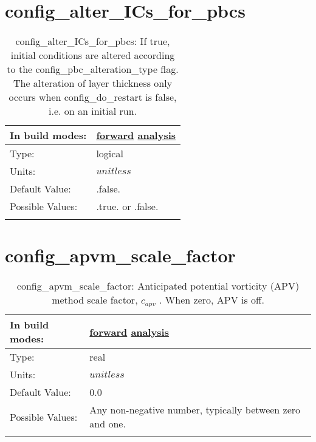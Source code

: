 \section[config\_alter\_ICs\_for\_pbcs]{config\_alter\_ICs\_for\_pbcs}
\label{sec:nm_sec_config_alter_ICs_for_pbcs}
\begin{center}
\begin{longtable}{| p{2.0in} || p{4.0in} |}
    \hline
    In build modes: & \hyperref[subsec:forward_nm_tab_partial_bottom_cells]{forward} \hyperref[subsec:analysis_nm_tab_partial_bottom_cells]{analysis} \\
    \hline
    Type: & logical \\
    \hline
    Units: & $unitless$ \\
    \hline
    Default Value: & .false. \\
    \hline
    Possible Values: & .true. or .false. \\
    \hline
    \caption{config\_alter\_ICs\_for\_pbcs: If true, initial conditions are altered according to the config\_pbc\_alteration\_type flag. The alteration of layer thickness only occurs when config\_do\_restart is false, i.e. on an initial run.}
\end{longtable}
\end{center}
\section[config\_apvm\_scale\_factor]{config\_apvm\_scale\_factor}
\label{sec:nm_sec_config_apvm_scale_factor}
\begin{center}
\begin{longtable}{| p{2.0in} || p{4.0in} |}
    \hline
    In build modes: & \hyperref[subsec:forward_nm_tab_hmix]{forward} \hyperref[subsec:analysis_nm_tab_hmix]{analysis} \\
    \hline
    Type: & real \\
    \hline
    Units: & $unitless$ \\
    \hline
    Default Value: & 0.0 \\
    \hline
    Possible Values: & Any non-negative number, typically between zero and one. \\
    \hline
    \caption{config\_apvm\_scale\_factor:  Anticipated potential vorticity (APV) method scale factor,  $c_{apv}$ . When zero, APV is off.}
\end{longtable}
\end{center}
